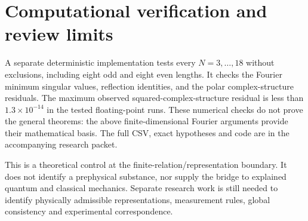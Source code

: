 \documentclass[11pt,letterpaper]{article}
\begin{document}
\section{Computational verification and review limits}
A separate deterministic implementation tests every $N=3,\ldots,18$ without exclusions, including eight odd and eight even lengths. It checks the Fourier minimum singular values, reflection identities, and the polar complex-structure residuals. The maximum observed squared-complex-structure residual is less than $1.3\times10^{-14}$ in the tested floating-point runs. These numerical checks do not prove the general theorems: the above finite-dimensional Fourier arguments provide their mathematical basis. The full CSV, exact hypotheses and code are in the accompanying research packet.

This is a theoretical control at the finite-relation/representation boundary. It does not identify a prephysical substance, nor supply the bridge to explained quantum and classical mechanics. Separate research work is still needed to identify physically admissible representations, measurement rules, global consistency and experimental correspondence.
\end{document}
